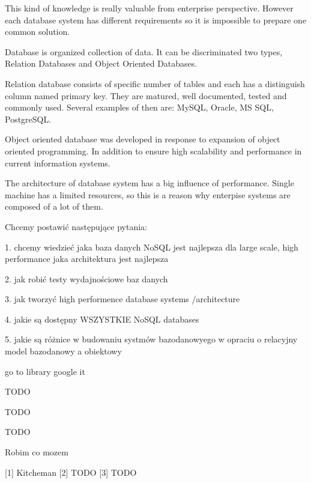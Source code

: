 \documentclass[times, 10pt,twocolumn]{article}
\begin{document}
This kind of knowledge is really valuable from enterprise perspective. However each database
system has different requirements so it is impossible to prepare one common solution.
 

Database is organized collection of data. It can be discriminated two types, 
Relation Databases and Object Oriented Databases.

Relation database consists of specific number of tables and each has a distinguish column named primary key. 
They are matured, well documented, tested and commonly used. Several examples of then are: MySQL, Oracle, MS SQL, PostgreSQL. 

Object oriented database was developed in response to expansion of object oriented programming. In addition to ensure high scalability and  
performance in current information systems.

The architecture of database system has a big influence of performance. Single machine has a limited
resources, so this is a reason why enterpise systems are composed of a lot of them.


Chcemy postawić następujące pytania:

1. chcemy wiedzieć jaka baza danych NoSQL jest najlepsza dla large scale, high performance
jaka architektura jest najlepsza

2. jak robić testy wydajnościowe baz danych

3. jak tworzyć high performence database systems /architecture

4. jakie są dostępny WSZYSTKIE NoSQL databases

5. jakie są różnice w budowaniu systmów bazodanowyego w opraciu o relacyjny model bazodanowy a obiektowy



go to library
google it


TODO


TODO



TODO


Robim co mozem

[1] Kitcheman
[2] TODO
[3] TODO


\nocite{ex1,ex2}


\end{document}
